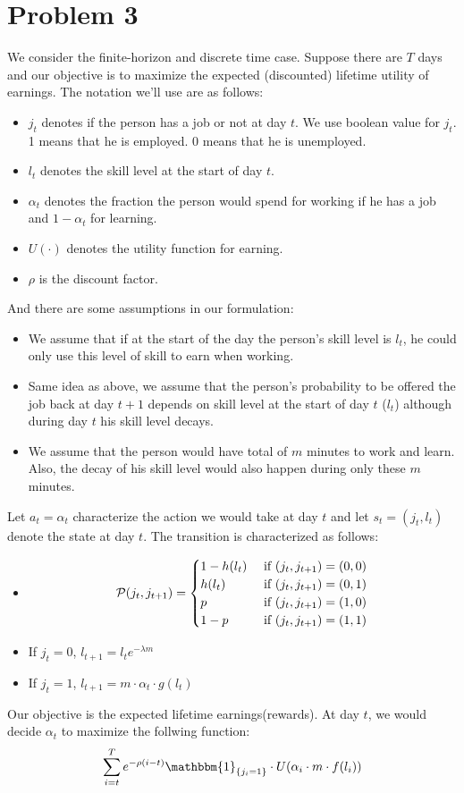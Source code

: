 \documentclass{article}
\begin{document}
\section*{Problem 3}
We consider the finite-horizon and discrete time case.   Suppose there are $T$ days and our objective is to maximize the expected (discounted) lifetime utility of earnings. The notation we'll use are as follows:
\begin{itemize}
\item $j_{t}$ denotes if the person has a job or not at day $t$. We use boolean value for $j_{t}$. 1 means that he is employed. 0 means that he is unemployed.
\item $l_{t}$ denotes the skill level at the start of day $t$.
\item $\alpha_{t}$ denotes the fraction the person would spend for working if he has a job and $1-\alpha_{t}$ for learning.
\item $U(\cdot)$ denotes the utility function for earning.
\item $\rho$ is the discount factor.
\end{itemize}
And there are some assumptions in our formulation:
\begin{itemize}
\item We assume that if at the start of the day the person's skill level is $l_{t}$, he could only use this level of skill to earn when working.
\item Same idea as above, we assume that the person's probability to be offered the job back at day $t+1$ depends on skill level at the start of day $t$ ($l_{t}$) although during day $t$ his skill level decays.
\item We assume that the person would have total of $m$ minutes to work and learn. Also, the decay of his skill level would also happen during only these $m$ minutes.
\end{itemize}
Let $a_{t}= \alpha_{t}$ characterize the action we would take at day $t$ and let $s_{t} = (j_t, l_t)$ denote the state at day $t$. The transition is characterized as follows:
\begin{itemize}
\item $$\mathcal{P}(j_{t}, j_{t+1})=\begin{cases} 1-h(l_t) & \text { if } (j_{t}, j_{t+1}) = (0,0) \\
h(l_t)  & \text { if } (j_{t}, j_{t+1}) = (0,1) \\
p & \text { if } (j_{t}, j_{t+1}) = (1,0) \\
1-p & \text { if } (j_{t}, j_{t+1}) = (1,1) \\
\end{cases} \\$$
\item If $j_{t}=0$, $l_{t+1} = l_{t} e^{-\lambda m}$
\item If $j_{t}=1$, $l_{t+1} = m\cdot \alpha_{t} \cdot g(l_{t}) $
\end{itemize}
Our objective is the expected lifetime earnings(rewards). At day $t$, we would decide $\alpha_{t}$ to maximize the follwing function:
$$\sum_{i=t}^{T} e^{-\rho (i-t)} \mathbbm{1}_{\{j_{i}=1\}} \cdot U(\alpha_{i}\cdot m \cdot f(l_{i}))$$
 
\end{document}
